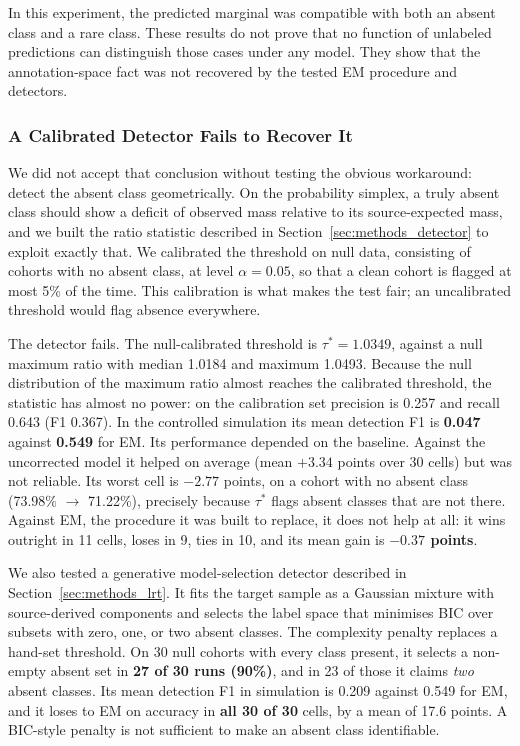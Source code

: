 \documentclass[11pt,a4paper]{article}
\begin{document}
In this experiment, the predicted marginal was compatible with both an absent class and a rare
class. These results do not prove that no function of unlabeled predictions can distinguish
those cases under any model. They show that the annotation-space fact was not recovered by the
tested EM procedure and detectors.

\subsubsection{A Calibrated Detector Fails to Recover It}

We did not accept that conclusion without testing the obvious workaround: detect the absent class
geometrically. On the probability simplex, a truly absent class should show a deficit of observed
mass relative to its source-expected mass, and we built the ratio statistic described in
Section~\ref{sec:methods_detector} to exploit exactly that. We calibrated the threshold on null
data, consisting of cohorts with no absent class, at level $\alpha = 0.05$, so that a clean cohort is flagged
at most 5\% of the time. This calibration is what makes the test fair; an uncalibrated threshold
would flag absence everywhere.

The detector fails. The null-calibrated threshold is $\tau^\ast = 1.0349$, against a null maximum
ratio with median 1.0184 and maximum 1.0493. Because the null distribution of the maximum ratio
almost reaches the calibrated threshold, the statistic has almost no power: on the calibration set
precision is 0.257 and recall 0.643 (F1 0.367). In the controlled simulation its mean detection F1
is \textbf{0.047} against \textbf{0.549} for EM. Its performance depended on the baseline. Against
the uncorrected model it helped on average (mean $+3.34$ points over 30 cells) but was not reliable.
Its
worst cell is $-2.77$ points, on a cohort with no absent class (73.98\% $\rightarrow$ 71.22\%),
precisely because $\tau^\ast$ flags absent classes that are not there. Against EM, the procedure it
was built to replace, it does not help at all: it wins outright in 11 cells, loses in 9, ties in
10, and its mean gain is \textbf{$-0.37$ points}.

We also tested a generative model-selection detector described in Section~\ref{sec:methods_lrt}.
It fits the target sample as a Gaussian mixture with source-derived components and selects the
label space that minimises BIC over subsets with zero, one, or two absent classes. The complexity
penalty replaces a hand-set threshold. On 30 null cohorts with every class present,
it selects a non-empty absent set in \textbf{27 of 30 runs (90\%)}, and in 23 of those it claims
\emph{two} absent classes. Its mean detection F1 in simulation is 0.209 against 0.549 for EM, and it
loses to EM on accuracy in \textbf{all 30 of 30} cells, by a mean of 17.6 points. A BIC-style
penalty is not sufficient to make an absent class identifiable.
\end{document}
